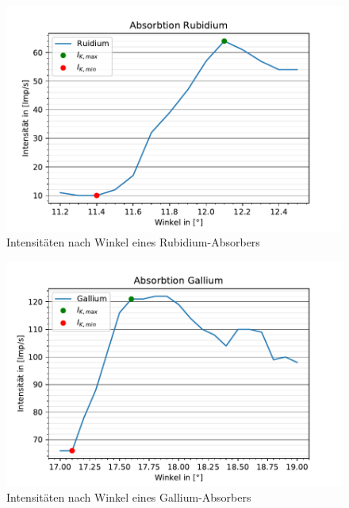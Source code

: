   \begin{figure}
    \centering
    \includegraphics{AbsorbtionsspektrumRubidium.pdf}
    \caption{Intensitäten nach Winkel eines Rubidium-Absorbers}
    \label{fig:EmspektrumVII}
  \end{figure}

  \begin{figure}
    \centering
    \includegraphics{AbsorbtionsspektrumGallium.pdf}
    \caption{Intensitäten nach Winkel eines Gallium-Absorbers}
    \label{fig:EmspektrumVIII}
  \end{figure}
  \newpage
